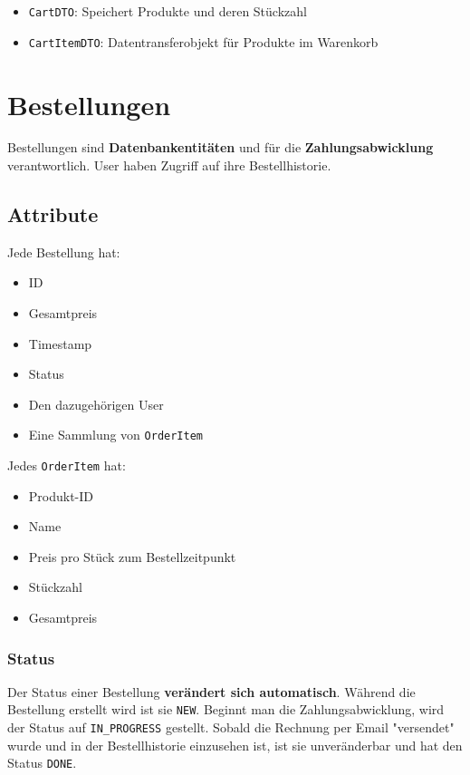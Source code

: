 \documentclass[12pt, a4paper]{scrreprt}
\begin{document}
	\begin{itemize}
		\item \texttt{CartDTO}: Speichert Produkte und deren Stückzahl 
		\item \texttt{CartItemDTO}: Datentransferobjekt für Produkte im Warenkorb
	\end{itemize}
	
	\chapter{Bestellungen}
	
	Bestellungen sind \textbf{Datenbankentitäten} und für die \textbf{Zahlungsabwicklung} verantwortlich. User haben Zugriff auf ihre Bestellhistorie.
	
		\section{Attribute}
		
		Jede Bestellung hat:
		\begin{itemize}
			\item ID
			\item Gesamtpreis
			\item Timestamp
			\item Status
			\item Den dazugehörigen User
			\item Eine Sammlung von \texttt{OrderItem}
		\end{itemize}
		
		Jedes \texttt{OrderItem} hat:
		\begin{itemize}
			\item Produkt-ID
			\item Name
			\item Preis pro Stück zum Bestellzeitpunkt
			\item Stückzahl
			\item Gesamtpreis
		\end{itemize}
		
			\subsection{Status}
			
			Der Status einer Bestellung \textbf{verändert sich automatisch}. Während die Bestellung erstellt wird ist sie \texttt{NEW}. Beginnt man die Zahlungsabwicklung, wird der Status auf \texttt{IN\_PROGRESS} gestellt. Sobald die Rechnung per Email "versendet" wurde und in der Bestellhistorie einzusehen ist, ist sie unveränderbar und hat den Status \texttt{DONE}. 
		
\end{document}
